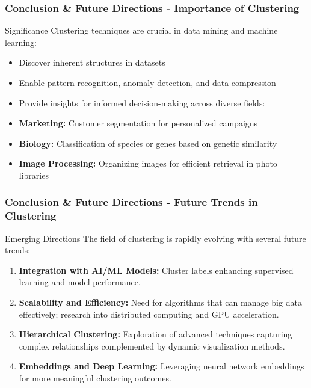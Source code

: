 \documentclass[aspectratio=169]{beamer}
\begin{document}
\begin{frame}[fragile]
    \frametitle{Conclusion \& Future Directions - Importance of Clustering}
    \begin{block}{Significance}
        Clustering techniques are crucial in data mining and machine learning:
        \begin{itemize}
            \item Discover inherent structures in datasets
            \item Enable pattern recognition, anomaly detection, and data compression
            \item Provide insights for informed decision-making across diverse fields:
        \end{itemize}
    \end{block}
    
    \begin{itemize}
        \item \textbf{Marketing:} Customer segmentation for personalized campaigns
        \item \textbf{Biology:} Classification of species or genes based on genetic similarity
        \item \textbf{Image Processing:} Organizing images for efficient retrieval in photo libraries
    \end{itemize}
\end{frame}

\begin{frame}[fragile]
    \frametitle{Conclusion \& Future Directions - Future Trends in Clustering}
    \begin{block}{Emerging Directions}
        The field of clustering is rapidly evolving with several future trends:
    \end{block}
    \begin{enumerate}
        \item \textbf{Integration with AI/ML Models:} Cluster labels enhancing supervised learning and model performance.
        \item \textbf{Scalability and Efficiency:} Need for algorithms that can manage big data effectively; research into distributed computing and GPU acceleration.
        \item \textbf{Hierarchical Clustering:} Exploration of advanced techniques capturing complex relationships complemented by dynamic visualization methods.
        \item \textbf{Embeddings and Deep Learning:} Leveraging neural network embeddings for more meaningful clustering outcomes.
    \end{enumerate}
\end{frame}
\end{document}
